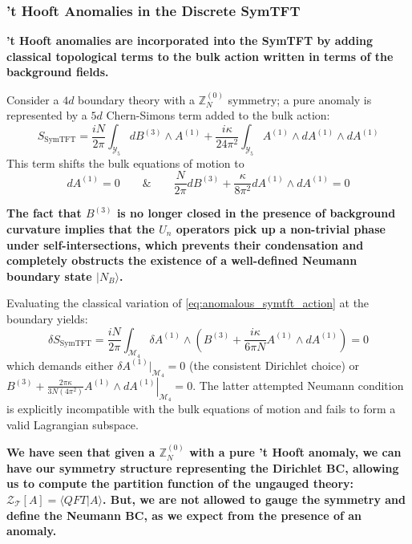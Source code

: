 \documentclass[aps,preprint,nofootinbib,preprintnumbers,eqsecnum,superscriptaddress]{revtex4}
\numberwithin{equation}{section}
\begin{document}
\subsubsection{'t Hooft Anomalies in the Discrete SymTFT}

{\bf 't Hooft anomalies are incorporated into the SymTFT by adding classical topological terms to the bulk action written in terms of the background fields.} 

Consider a $4d$ boundary theory with a $\mathbb{Z}_N^{(0)}$ symmetry; a pure anomaly is represented by a $5d$ Chern-Simons term added to the bulk action:
\begin{equation}\label{eq:anomalous_symtft_action}
    S_{\text{SymTFT}} = \frac{iN}{2\pi} \int_{\mathcal{Y}_5} dB^{(3)} \wedge A^{(1)} + \frac{i\kappa}{24\pi^2} \int_{\mathcal{Y}_5} A^{(1)} \wedge dA^{(1)} \wedge dA^{(1)}
\end{equation}
This term shifts the bulk equations of motion to 
\begin{equation}
    dA^{(1)} = 0 \qquad \& \qquad \frac{N}{2\pi} dB^{(3)} + \frac{\kappa}{8\pi^2} dA^{(1)} \wedge dA^{(1)} = 0
\end{equation}

{\bf The fact that $B^{(3)}$ is no longer closed in the presence of background curvature implies that the $U_n$ operators pick up a non-trivial phase under self-intersections, which prevents their condensation and completely obstructs the existence of a well-defined Neumann boundary state $|N_B\rangle$. }

Evaluating the classical variation of \eqref{eq:anomalous_symtft_action} at the boundary yields:
\begin{equation}
    \delta S_{\text{SymTFT}} = \frac{iN}{2\pi} \int_{\mathcal{M}_4} \delta A^{(1)} \wedge \left( B^{(3)} + \frac{i\kappa}{6\pi N} A^{(1)} \wedge dA^{(1)} \right) = 0
\end{equation}
which demands either $\delta A^{(1)}\big|_{\mathcal{M}_4} = 0$ (the consistent Dirichlet choice) or $\left. B^{(3)} + \frac{2\pi\kappa}{3N(4\pi^2)} A^{(1)} \wedge dA^{(1)} \right|_{\mathcal{M}_4} = 0$. The latter attempted Neumann condition is explicitly incompatible with the bulk equations of motion and fails to form a valid Lagrangian subspace.

{\bf We have seen that given a $\mathbb{Z}^{(0)}_N$ with a pure 't Hooft anomaly, we can have our symmetry structure representing the Dirichlet BC, allowing us to compute the partition function of the ungauged theory: $\mathcal{Z}_\mathcal{T}[A] = \langle QFT | A \rangle$. But, we are not allowed to gauge the symmetry and define the Neumann BC, as we expect from the presence of an anomaly.}
\end{document}
